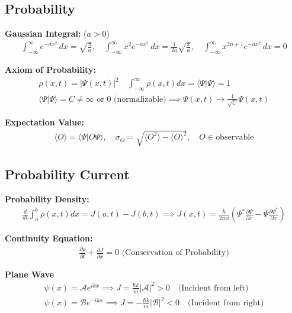 \documentclass[12pt]{article}
\begin{document}
\subsection{Probability } 

\textbf{Gaussian Integral: } ($a > 0$)
\begin{align}
    \int_{-\infty}^{\infty} e^{-ax^2}\,dx = \sqrt{\frac{\pi}{a}}, \quad
    \int_{-\infty}^{\infty} x^2 e^{-ax^2}\,dx = \frac{1}{2a}\sqrt{\frac{\pi}{a}}, \quad
    \int_{-\infty}^{\infty} x^{2n+1} e^{-ax^2}\,dx = 0
\end{align}

\textbf{Axiom of Probability: }
\begin{align}
    \rho(x,t) = |\Psi(x,t)|^2 \quad \int_{-\infty}^{\infty} \rho(x,t) dx = \langle \Psi | \Psi \rangle = 1 \\
    \langle \Psi | \Psi \rangle = C \neq \infty \text{ or } 0 \text{ (normalizable)} \implies \Psi(x,t) \to \frac{1}{\sqrt{C}} \Psi(x,t)
\end{align}

\textbf{Expectation Value: } 
\begin{align}
    \langle O \rangle = \langle \Psi | O \Psi \rangle, \quad \sigma_O = \sqrt{\langle O^2 \rangle - \langle O \rangle^2}, \quad O \in \text{observable}
\end{align} 

\subsection{Probability Current } 

\textbf{Probability Density: }
\begin{align}
    \frac{d}{dt} \int^b_a \rho(x,t) dx = J(a,t) - J(b,t) \implies J(x,t) = \frac{\hbar}{2mi} \left( \Psi^* \frac{\partial \Psi}{\partial x} - \Psi \frac{\partial \Psi^*}{\partial x} \right) 
\end{align} 

\textbf{Continuity Equation: }
\begin{align}
    \frac{\partial \rho}{\partial t} + \frac{\partial J}{\partial x} = 0 \text{ (Conservation of Probability)}
\end{align} 

\textbf{Plane Wave } 
\begin{align} 
    \psi(x) = \mathcal{A} e^{ikx} \implies J = \frac{\hbar k}{m} |\mathcal{A}|^2 > 0 \quad \text{(Incident from left)} \\ 
    \psi(x) = \mathcal{B} e^{-ikx} \implies J = -\frac{\hbar k}{m} |\mathcal{B}|^2 < 0 \quad \text{(Incident from right)} 
\end{align} 
\end{document}
